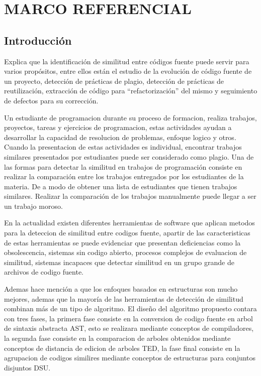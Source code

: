 \chapter{MARCO REFERENCIAL}

\section{Introducción}
\cite{unknown1} Explica que la identificación de similitud entre códigos fuente puede servir para varios propósitos, entre ellos están el estudio de la evolución de código fuente de un proyecto, detección de prácticas de plagio, detección de prácticas de reutilización, extracción de código para “refactorización” del mismo y seguimiento de defectos para su corrección.

Un estudiante de programacion durante su proceso de formacion, realiza trabajos, proyectos, tareas y  ejercicios de programacion, estas actividades ayudan a desarrollar la capacidad de resolucion de problemas, enfoque logico y otros. Cuando la presentacion de estas actividades es individual, encontrar trabajos similares presentados por estudiantes puede ser considerado como plagio. Una de las formas para detectar la similitud en trabajos de programación consiste en realizar la comparación entre los trabajos entregados por los estudiantes de la materia. De a modo de obtener una lista de estudiantes que tienen trabajos similares. Realizar la comparación de los trabajos manualmente puede llegar a ser un trabajo moroso.

En la actualidad existen diferentes herramientas de software que aplican metodos para la deteccion de similitud entre codigos fuente, apartir de las caracteristicas de estas herramientas se puede evidenciar que presentan deficiencias como la obsolescencia, sistemas sin codigo abierto, procesos complejos de evaluacion de similitud, sistemas incapaces que detectar similitud en un grupo grande de archivos de codigo fuente.

Ademas \cite{Novak2019} hace mención a que los enfoques basados en estructuras son mucho mejores, ademas que la mayoría de las herramientas de detección de similitud combinan más de un tipo de algoritmo. El diseño del algoritmo propuesto contara con tres fases, la primera fase consiste en la conversion de codigo fuente en arbol de sintaxis abstracta AST, esto se realizara mediante conceptos de compiladores, la segunda fase consiste en la comparacion de arboles obtenidos mediante conceptos de distancia de edicion de arboles TED, la fase final consiste en la agrupacion de codigos similires mediante conceptos de estructuras para conjuntos disjuntos DSU.


